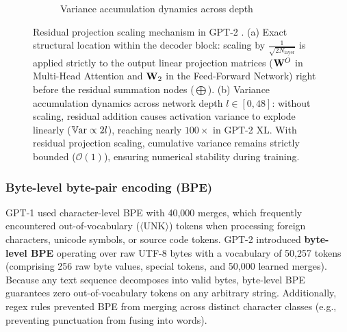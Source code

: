\documentclass[../../main.tex]{subfiles}
\begin{document}
\begin{figure}[htbp]
\begin{subfigure}[b]{0.50\textwidth}
{%
}
\caption{Variance accumulation dynamics across depth}
\label{fig:residual_scaling_dynamics}
\end{subfigure}
\caption{Residual projection scaling mechanism in GPT-2 \cite{radford2019}. (a) Exact structural location within the decoder block: scaling by $\frac{1}{\sqrt{2N_{\text{layer}}}}$ is applied strictly to the output linear projection matrices ($\mathbf{W}^O$ in Multi-Head Attention and $\mathbf{W}_2$ in the Feed-Forward Network) right before the residual summation nodes ($\bigoplus$). (b) Variance accumulation dynamics across network depth $l \in [0, 48]$: without scaling, residual addition causes activation variance to explode linearly ($\operatorname{\mathbb{V}\mathrm{ar}} \propto 2l$), reaching nearly $100\times$ in GPT-2 XL. With residual projection scaling, cumulative variance remains strictly bounded ($\mathcal{O}(1)$), ensuring numerical stability during training.}
\label{fig:residual_projection_scaling}
\end{figure}

\subsubsection{Byte-level byte-pair encoding (BPE)}
GPT-1 used character-level BPE with 40,000 merges, which frequently encountered out-of-vocabulary ($\langle\text{UNK}\rangle$) tokens when processing foreign characters, unicode symbols, or source code tokens. GPT-2 introduced \textbf{byte-level BPE} operating over raw UTF-8 bytes with a vocabulary of 50,257 tokens (comprising 256 raw byte values, special tokens, and 50,000 learned merges). Because any text sequence decomposes into valid bytes, byte-level BPE guarantees zero out-of-vocabulary tokens on any arbitrary string. Additionally, regex rules prevented BPE from merging across distinct character classes (e.g., preventing punctuation from fusing into words).
\end{document}
